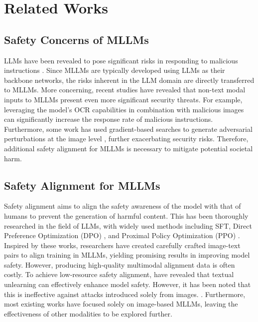 \section{Related Works}
\subsection{Safety Concerns of MLLMs}
LLMs have been revealed to pose significant risks in responding to malicious instructions \cite{zou2023universal, liu2023autodan, chao2023jailbreaking}. 
Since MLLMs are typically developed using LLMs as their backbone networks, the risks inherent in the LLM domain are directly transferred to MLLMs. 
More concerning, recent studies have revealed that non-text modal inputs to MLLMs present even more significant security threats. 
For example, leveraging the model's OCR capabilities in combination with malicious images \cite{gong2023figstep,luo2024jailbreakv} can significantly increase the response rate of malicious instructions. 
Furthermore, some work has used gradient-based searches to generate adversarial perturbations at the image level \cite{li2024images, qi2024visual, niu2024jailbreaking}, further exacerbating security risks.
Therefore, additional safety alignment for MLLMs is necessary to mitigate potential societal harm.

\subsection{Safety Alignment for MLLMs}
Safety alignment aims to align the safety awareness of the model with that of humans to prevent the generation of harmful content. 
This has been thoroughly researched in the field of LLMs, with widely used methods including SFT, Direct Preference Optimization (DPO) \cite{rafailov2024direct}, and Proximal Policy Optimization (PPO) \cite{schulman2017proximal}. 
Inspired by these works, researchers have created carefully crafted image-text pairs to align training in MLLMs, yielding promising results in improving model safety. 
However, producing high-quality multimodal alignment data is often costly.
To achieve low-resource safety alignment, \citet{chakraborty2024cross} have revealed that textual unlearning can effectively enhance model safety. 
However, it has been noted that this is ineffective against attacks introduced solely from images. \cite{hu2024vlsbench}. 
Furthermore, most existing works have focused solely on image-based MLLMs, leaving the effectiveness of other modalities to be explored further. 

